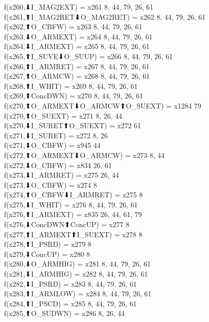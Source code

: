 f(x260,⬇I_MAG2EXT) = x261 {8, 44, 79, 26, 61} \\
f(x261,⬆I_MAG2RET⬇O_MAG2RET) = x262 {8, 44, 79, 26, 61} \\
f(x262,⬆O_CBFW) = x263 {8, 44, 79, 26, 61} \\
f(x263,⬇O_ARMEXT) = x264 {8, 44, 79, 26, 61} \\
f(x264,⬇I_ARMEXT) = x265 {8, 44, 79, 26, 61} \\
f(x265,⬆I_SUVE⬇O_SUUP) = x266 {8, 44, 79, 26, 61} \\
f(x266,⬆I_ARMRET) = x267 {8, 44, 79, 26, 61} \\
f(x267,⬆O_ARMCW) = x268 {8, 44, 79, 26, 61} \\
f(x268,⬆I_WHIT) = x269 {8, 44, 79, 26, 61} \\
f(x269,⬆ConcDWN) = x270 {8, 44, 79, 26, 61} \\
f(x270,⬆O_ARMEXT⬇O_ARMCW⬆O_SUEXT) = x1284 {79} \\
f(x270,⬆O_SUEXT) = x271 {8, 26, 44} \\
f(x270,⬇I_SURET⬆O_SUEXT) = x272 {61} \\
f(x271,⬇I_SURET) = x272 {8, 26} \\
f(x271,⬇O_CBFW) = x945 {44} \\
f(x272,⬆O_ARMEXT⬇O_ARMCW) = x273 {8, 44} \\
f(x272,⬇O_CBFW) = x834 {26, 61} \\
f(x273,⬇I_ARMRET) = x275 {26, 44} \\
f(x273,⬇O_CBFW) = x274 {8} \\
f(x274,⬆O_CBFW⬇I_ARMRET) = x275 {8} \\
f(x275,⬇I_WHIT) = x276 {8, 44, 79, 26, 61} \\
f(x276,⬆I_ARMEXT) = x835 {26, 44, 61, 79} \\
f(x276,⬇ConcDWN⬆ConcUP) = x277 {8} \\
f(x277,⬆I_ARMEXT⬆I_SUEXT) = x278 {8} \\
f(x278,⬆I_PSRD) = x279 {8} \\
f(x279,⬇ConcUP) = x280 {8} \\
f(x280,⬇O_ARMHIG) = x281 {8, 44, 79, 26, 61} \\
f(x281,⬇I_ARMHIG) = x282 {8, 44, 79, 26, 61} \\
f(x282,⬇I_PSRD) = x283 {8, 44, 79, 26, 61} \\
f(x283,⬆I_ARMLOW) = x284 {8, 44, 79, 26, 61} \\
f(x284,⬆I_PSCD) = x285 {8, 44, 79, 26, 61} \\
f(x285,⬆O_SUDWN) = x286 {8, 26, 44} \\
